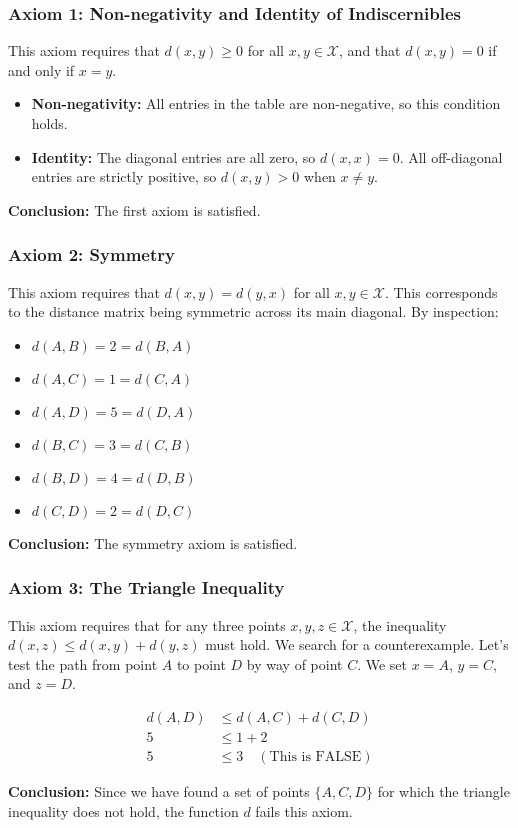 \documentclass{article}
\begin{document}
\subsubsection*{Axiom 1: Non-negativity and Identity of Indiscernibles}
\parbox{\textwidth}{
This axiom requires that $d(x, y) \geq 0$ for all $x, y \in \mathcal{X}$, and that $d(x, y) = 0$ if and only if $x = y$.
\begin{itemize}
    \item \textbf{Non-negativity:} All entries in the table are non-negative, so this condition holds.
    \item \textbf{Identity:} The diagonal entries are all zero, so $d(x, x) = 0$. All off-diagonal entries are strictly positive, so $d(x, y) > 0$ when $x \neq y$.
\end{itemize}
\textbf{Conclusion:} The first axiom is satisfied.
}

\subsubsection*{Axiom 2: Symmetry}
\parbox{\textwidth}{
This axiom requires that $d(x, y) = d(y, x)$ for all $x, y \in \mathcal{X}$. This corresponds to the distance matrix being symmetric across its main diagonal. By inspection:
\begin{itemize}
    \item $d(A, B) = 2 = d(B, A)$
    \item $d(A, C) = 1 = d(C, A)$
    \item $d(A, D) = 5 = d(D, A)$
    \item $d(B, C) = 3 = d(C, B)$
    \item $d(B, D) = 4 = d(D, B)$
    \item $d(C, D) = 2 = d(D, C)$
\end{itemize}
\textbf{Conclusion:} The symmetry axiom is satisfied.
}

\subsubsection*{Axiom 3: The Triangle Inequality}
\parbox{\textwidth}{
This axiom requires that for any three points $x, y, z \in \mathcal{X}$, the inequality $d(x, z) \leq d(x, y) + d(y, z)$ must hold. We search for a counterexample. Let's test the path from point $A$ to point $D$ by way of point $C$. We set $x=A$, $y=C$, and $z=D$.
}
\begin{align*}
    d(A, D) &\leq d(A, C) + d(C, D) \\
    5 &\leq 1 + 2 \\
    5 &\leq 3 \quad (\text{This is FALSE})
\end{align*}
\parbox{\textwidth}{
\textbf{Conclusion:} Since we have found a set of points $\{A, C, D\}$ for which the triangle inequality does not hold, the function $d$ fails this axiom.
}
\end{document}
